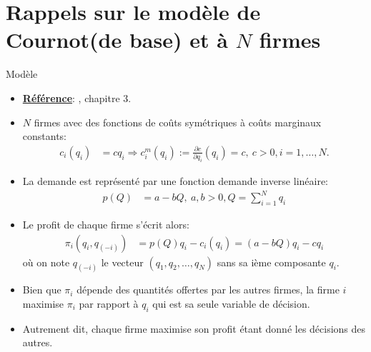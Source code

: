 \begin{frame}
\titlepage
\end{frame}
\begin{frame}
 \tableofcontents
    \end{frame}



\section{Rappels sur le modèle de Cournot(de base) et à $N$ firmes}
\frame{\sectionpage}
\begin{frame}[allowframebreaks]{Modèle}
\begin{itemize}
\item \textbf{\underline{Référence}}: \cite{belleflamme_peitz_2015}, chapitre 3.
\item $N$ firmes avec des fonctions de coûts symétriques à coûts marginaux constants:
\begin{align*}
    c_i(q_i) &=cq_i \Rightarrow c^m_i(q_i):= \frac{\partial c}{\partial q_i}(q_i) = c, \ c > 0, i=1, \ldots, N.
\end{align*}
\item La demande est représenté par une fonction demande inverse linéaire:
\begin{align*}
p(Q) &= a-bQ, \ a, b > 0, Q = \sum_{i=1}^N q_i
\end{align*}
\item Le profit de chaque firme s'écrit alors: 
\begin{align*}
\pi_i(q_i, q_{(-i)}) &= p(Q)q_i - c_i(q_i) =  (a-bQ)q_i - cq_i
\end{align*}
où on note $q_{(-i)}$ le vecteur $(q_1, q_2, \ldots, q_N)$ sans sa ième composante $q_i$.
\item Bien que $\pi_i$ dépende des quantités offertes par les autres firmes, 
la firme $i$ maximise $\pi_i$ par rapport à $q_i$ qui est sa seule variable de décision.
\item Autrement dit, chaque firme maximise son profit étant donné les décisions des autres.
\end{itemize}
\end{frame}

